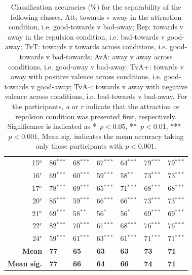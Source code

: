 \begin{table}[p]
\begin{tabular}{rllllll}
        15$^a$              & 86{\tiny$^{***}$}  & 68{\tiny$^{***}$}  & 67{\tiny$^{***}$} & 64{\tiny$^{***}$} & 79{\tiny$^{***}$} & 79{\tiny$^{***}$} \\
        16$^r$              & 69{\tiny$^{***}$}  & 60{\tiny$^{***}$}  & 59{\tiny$^{***}$} & 58{\tiny$^{**}$}  & 73{\tiny$^{***}$} & 73{\tiny$^{***}$} \\
        17$^a$              & 78{\tiny$^{***}$}  & 69{\tiny$^{***}$}  & 65{\tiny$^{***}$} & 71{\tiny$^{***}$} & 68{\tiny$^{***}$} & 68{\tiny$^{***}$} \\
        20$^r$              & 85{\tiny$^{***}$}  & 59{\tiny$^{***}$}  & 66{\tiny$^{***}$} & 66{\tiny$^{***}$} & 73{\tiny$^{***}$} & 73{\tiny$^{***}$} \\
        21$^a$              & 69{\tiny$^{***}$}  & 58{\tiny$^{**}$}   & 56{\tiny$^{*}$}   & 56{\tiny$^{*}$}   & 69{\tiny$^{***}$} & 69{\tiny$^{***}$} \\
        22$^r$              & 82{\tiny$^{***}$}  & 70{\tiny$^{***}$}  & 61{\tiny$^{***}$} & 68{\tiny$^{***}$} & 76{\tiny$^{***}$} & 76{\tiny$^{***}$} \\
        24$^r$              & 59{\tiny$^{***}$}  & 61{\tiny$^{***}$}  & 63{\tiny$^{***}$} & 61{\tiny$^{***}$} & 71{\tiny$^{***}$} & 71{\tiny$^{***}$} \\
        \textbf{Mean}       & \textbf{77}        & \textbf{65}        & \textbf{63}       & \textbf{63}       & \textbf{73}       & \textbf{71}       \\
        \textbf{Mean sig.}  & \textbf{77}        & \textbf{66}        & \textbf{64}       & \textbf{66}       & \textbf{74}       & \textbf{71}       \\
    \end{tabular}
    \caption[Classification accuracies.]{Classification accuracies (\%) for the separability of the following classes. Att: towards v away in the attraction condition, i.e. good-towards v bad-away; Rep: towards v away in the repulsion condition, i.e. bad-towards v good-away; TvT: towards v towards across conditions, i.e. good-towards v bad-towards; AvA: away v away across conditions, i.e. good-away v bad-away; TvA+: towards v away with positive valence across conditions, i.e. good-towards v good-away; TvA--: towards v away with negative valence across conditions, i.e. bad-towards v bad-away. For the participants, \emph{a} or \emph{r} indicate that the attraction or repulsion condition was presented first, respectively. Significance is indicated as *~$\scriptstyle{p<0.05}$, **~$\scriptstyle{p<0.01}$, ***~$\scriptstyle{p<0.001}$. Mean sig. indicates the mean accuracy taking only those participants with $\scriptstyle{p<0.001}$.}
    \label{salval:tab:bci}
\end{table}

